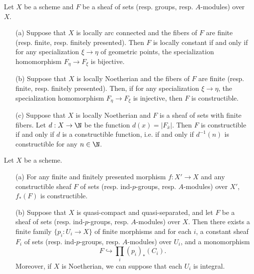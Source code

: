 \begin{proposition}
Let $X$ be a scheme and $F$ be a sheaf of sets (resp. groups, resp. $A$-modules) over $X$.
\begin{enumerate}
    \item[(a)] Suppose that $X$ is locally arc connected and the fibers of $F$ are finite (resp. finite, resp. finitely presented). Then $F$ is locally constant if and only if for any specialization $\xi\to\eta$ of geometric points, the specialization homomorphism $F_\eta\to F_\xi$ is bijective.
    \item[(b)] Suppose that $X$ is locally Noetherian and the fibers of $F$ are finite (resp. finite, resp. finitely presented). Then, if for any specialization $\xi\to\eta$, the specialization homomorphism $F_\eta\to F_\xi$ is injective, then $F$ is constructible.
    \item[(c)] Suppose that $X$ is locally Noetherian and $F$ is a sheaf of sets with finite fibers. Let $d:X\to\N$ be the function $d(x)=|F_{\bar{x}}|$. Then $F$ is constructible if and only if $d$ is a constructible function, i.e. if and only if $d^{-1}(n)$ is constructible for any $n\in\N$.
\end{enumerate}
\end{proposition}

\begin{proposition}\label{scheme etale constructible iff embedded into direct image}
Let $X$ be a scheme.
\begin{enumerate}
    \item[(a)] For any finite and finitely presented morphism $f:X'\to X$ and any constructible sheaf $F$ of sets (resp. ind-$p$-groups, resp. $A$-modules) over $X'$, $f_*(F)$ is constructible.
    \item[(b)] Suppose that $X$ is quasi-compact and quasi-separated, and let $F$ be a sheaf of sets (resp. ind-$p$-groups, resp. $A$-modules) over $X$. Then there exists a finite family $\{p_i:U_i\to X\}$ of finite morphisms and for each $i$, a constant sheaf $F_i$ of sets (resp. ind-$p$-groups, resp. $A$-modules) over $U_i$, and a monomorphism
    \[F\hookrightarrow \prod_i(p_i)_*(C_i).\]
    Moreover, if $X$ is Noetherian, we can suppose that each $U_i$ is integral.
\end{enumerate}
\end{proposition}


